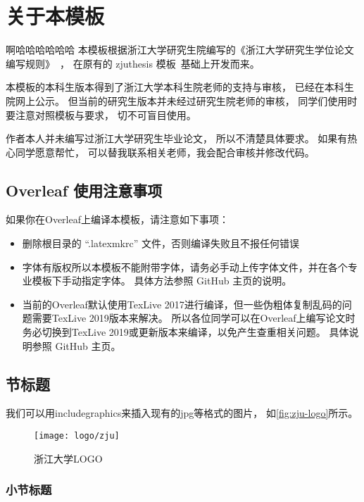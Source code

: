
\chapter{关于本模板}
啊哈哈哈哈哈哈
本模板根据浙江大学研究生院编写的《浙江大学研究生学位论文编写规则》~\cite{zjugradthesisrules}，
在原有的 zjuthesis 模板~\cite{zjuthesis}基础上开发而来。

本模板的本科生版本\cite{zjuthesisrules}得到了浙江大学本科生院老师的支持与审核，
已经在本科生院网上公示。
但当前的研究生版本并未经过研究生院老师的审核，
同学们使用时要注意对照模板与要求，
切不可盲目使用。

作者本人并未编写过浙江大学研究生毕业论文，
所以不清楚具体要求。
如果有热心同学愿意帮忙，
可以替我联系相关老师，我会配合审核并修改代码。

\section{Overleaf 使用注意事项}

如果你在Overleaf上编译本模板，请注意如下事项：

\begin{itemize}
    \item 删除根目录的 ``.latexmkrc'' 文件，否则编译失败且不报任何错误
    \item 字体有版权所以本模板不能附带字体，请务必手动上传字体文件，并在各个专业模板下手动指定字体。
        具体方法参照 GitHub 主页的说明。
    \item 当前的Overleaf默认使用TexLive 2017进行编译，但一些伪粗体复制乱码的问题需要TexLive 2019版本来解决。
        所以各位同学可以在Overleaf上编写论文时务必切换到TexLive 2019或更新版本来编译，以免产生查重相关问题。
        具体说明参照 GitHub 主页。
\end{itemize}


\section{节标题}

我们可以用includegraphics来插入现有的jpg等格式的图片，
如\autoref{fig:zju-logo}所示。

\begin{figure}[htbp]
    \centering
    \texttt{[image: logo/zju]}
    \caption{\label{fig:zju-logo}浙江大学LOGO}
\end{figure}


\subsection{小节标题}



